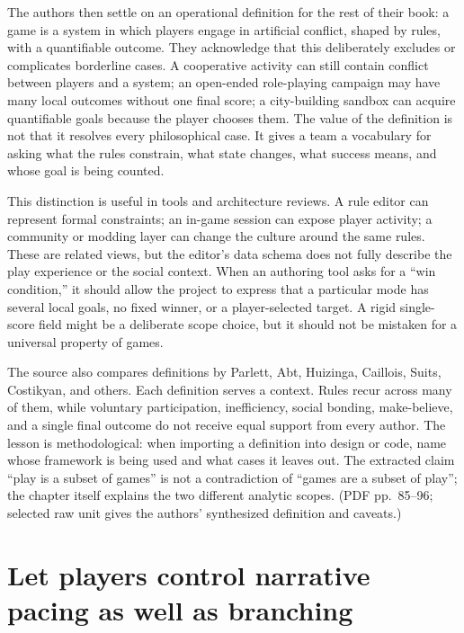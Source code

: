 The authors then settle on an operational definition for the rest of their book: a game is a system in which players engage in artificial conflict, shaped by rules, with a quantifiable outcome. They acknowledge that this deliberately excludes or complicates borderline cases. A cooperative activity can still contain conflict between players and a system; an open-ended role-playing campaign may have many local outcomes without one final score; a city-building sandbox can acquire quantifiable goals because the player chooses them. The value of the definition is not that it resolves every philosophical case. It gives a team a vocabulary for asking what the rules constrain, what state changes, what success means, and whose goal is being counted.

This distinction is useful in tools and architecture reviews. A rule editor can represent formal constraints; an in-game session can expose player activity; a community or modding layer can change the culture around the same rules. These are related views, but the editor's data schema does not fully describe the play experience or the social context. When an authoring tool asks for a ``win condition,'' it should allow the project to express that a particular mode has several local goals, no fixed winner, or a player-selected target. A rigid single-score field might be a deliberate scope choice, but it should not be mistaken for a universal property of games.

The source also compares definitions by Parlett, Abt, Huizinga, Caillois, Suits, Costikyan, and others. Each definition serves a context. Rules recur across many of them, while voluntary participation, inefficiency, social bonding, make-believe, and a single final outcome do not receive equal support from every author. The lesson is methodological: when importing a definition into design or code, name whose framework is being used and what cases it leaves out. The extracted claim ``play is a subset of games'' is not a contradiction of ``games are a subset of play''; the chapter itself explains the two different analytic scopes. (PDF pp.~85--96; selected raw unit  gives the authors' synthesized definition and caveats.)

\section{Let players control narrative pacing as well as branching}\label{06-engine-ii-ch047-let-players-control-narrative-pacing-as-well-as-branching}

